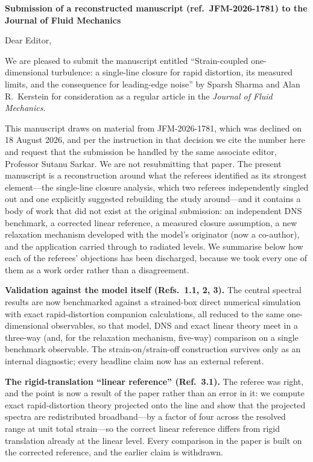 \documentclass[11pt,a4paper]{article}
\newcommand{\Subject}{Submission of a reconstructed manuscript
(ref.\ JFM-2026-1781) to the Journal of Fluid Mechanics}
\newcommand{\ManuscriptTitle}{Strain-coupled one-dimensional turbulence:
a single-line closure for rapid distortion, its measured limits, and the
consequence for leading-edge noise}
\begin{document}
{\bfseries \Subject}

\vspace{11mm}

Dear Editor,

\vspace{5mm}

We are pleased to submit the manuscript entitled
``\ManuscriptTitle'' by Sparsh Sharma and Alan R.\ Kerstein for
consideration as a regular article in the \textit{Journal of Fluid
Mechanics}.

\vspace{5mm}

This manuscript draws on material from JFM-2026-1781, which was
declined on 18 August 2026, and per the instruction in that decision we
cite the number here and request that the submission be handled by the
same associate editor, Professor Sutanu Sarkar. We are not resubmitting
that paper. The present manuscript is a reconstruction around what the
referees identified as its strongest element---the single-line closure
analysis, which two referees independently singled out and one
explicitly suggested rebuilding the study around---and it contains a
body of work that did not exist at the original submission: an
independent DNS benchmark, a corrected linear reference, a measured
closure assumption, a new relaxation mechanism developed with the
model's originator (now a co-author), and the application carried
through to radiated levels. We summarise below how each of the
referees' objections has been discharged, because we took every one of
them as a work order rather than a disagreement.

\vspace{5mm}

\textbf{Validation against the model itself (Refs.\ 1.1, 2, 3).} The
central spectral results are now benchmarked against a strained-box
direct numerical simulation with exact rapid-distortion companion
calculations, all reduced to the same one-dimensional observables, so
that model, DNS and exact linear theory meet in a three-way (and, for
the relaxation mechanism, five-way) comparison on a single benchmark
observable. The strain-on/strain-off construction survives only as an
internal diagnostic; every headline claim now has an external referent.

\vspace{5mm}

\textbf{The rigid-translation ``linear reference'' (Ref.\ 3.1).} The
referee was right, and the point is now a result of the paper rather
than an error in it: we compute exact rapid-distortion theory projected
onto the line and show that the projected spectra are redistributed
broadband---by a factor of four across the resolved range at unit total
strain---so the correct linear reference differs from rigid translation
already at the linear level. Every comparison in the paper is built on
the corrected reference, and the earlier claim is withdrawn.
\end{document}
